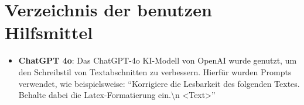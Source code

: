 \chapter{Verzeichnis der benutzen Hilfsmittel}

\begin{itemize}
    \item \textbf{ChatGPT 4o}: Das ChatGPT-4o KI-Modell von OpenAI wurde genutzt, um den Schreibstil von Textabschnitten zu verbessern. Hierfür wurden Prompts verwendet, wie beispielsweise: \enquote{Korrigiere die Lesbarkeit des folgenden Textes. Behalte dabei die Latex-Formatierung ein.{\textbackslash}n <Text>}
\end{itemize}

